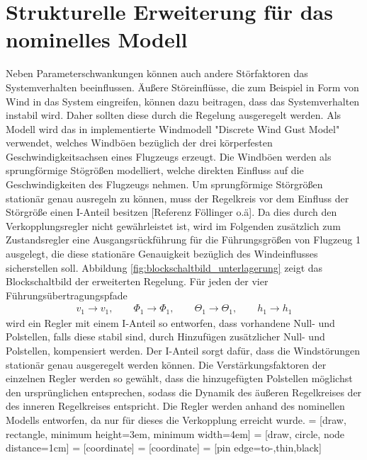 \section{Strukturelle Erweiterung für das nominelles Modell}
Neben Parameterschwankungen können auch andere Störfaktoren das Systemverhalten beeinflussen. Äußere Störeinflüsse, die zum Beispiel in Form von Wind in das System eingreifen, können dazu beitragen, dass das Systemverhalten instabil wird. Daher sollten diese durch die Regelung ausgeregelt werden. Als Modell wird das in \Simulink implementierte Windmodell "Discrete Wind Gust Model" verwendet, welches Windböen bezüglich der drei körperfesten Geschwindigkeitsachsen eines Flugzeugs erzeugt. Die Windböen werden als sprungförmige Stögrößen modelliert, welche direkten Einfluss auf die Geschwindigkeiten des Flugzeugs nehmen. Um sprungförmige Störgrößen stationär genau ausregeln zu können, muss der Regelkreis vor dem Einfluss der Störgröße einen I-Anteil besitzen [Referenz Föllinger o.ä]. Da dies durch den Verkopplungsregler nicht gewährleistet ist, wird im Folgenden zusätzlich zum Zustandsregler eine Ausgangsrückführung für die Führungsgrößen von Flugzeug 1 ausgelegt, die diese stationäre Genauigkeit bezüglich des Windeinflusses sicherstellen soll. Abbildung \ref{fig:blockschaltbild_unterlagerung} zeigt das Blockschaltbild der erweiterten Regelung. Für jeden der vier Führungsübertragungspfade 
\begin{align*}
	v_1 \rightarrow v_1, \qquad \Phi_1 \rightarrow \Phi_1, \qquad \Theta_1 \rightarrow \Theta_1, \qquad h_1 \rightarrow h_1 
\end{align*}
wird ein Regler mit einem I-Anteil so entworfen, dass vorhandene Null- und Polstellen, falls diese stabil sind, durch Hinzufügen zusätzlicher Null- und Polstellen, kompensiert werden. Der I-Anteil sorgt dafür, dass die Windstörungen stationär genau ausgeregelt werden können. Die Verstärkungsfaktoren der einzelnen Regler werden so gewählt, dass die hinzugefügten Polstellen möglichst den ursprünglichen entsprechen, sodass die Dynamik des äußeren Regelkreises der des inneren Regelkreises entspricht. Die Regler werden anhand des nominellen Modells entworfen, da nur für dieses die Verkopplung erreicht wurde.
 = [draw, rectangle, 
minimum height=3em, minimum width=4em]
 = [draw, circle, node distance=1cm]
 = [coordinate]
 = [coordinate]
 = [pin edge={to-,thin,black}]

